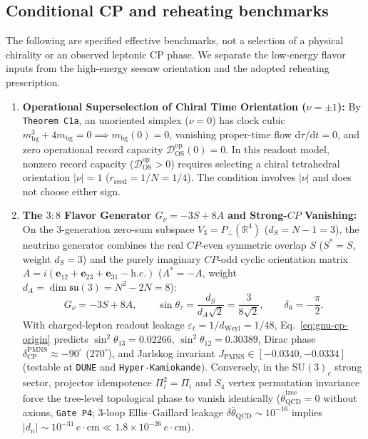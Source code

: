 \documentclass[11pt,a4paper]{article}
\begin{document}
\subsection{Conditional CP and reheating benchmarks}
\label{sec:cp-violation-and-f54-f55}

The following are specified effective benchmarks, not a selection of a physical chirality or an observed leptonic CP phase. We separate the low-energy flavor inputs from the high-energy seesaw orientation and the adopted reheating prescription.
\begin{enumerate}[label=(\arabic*),leftmargin=1.8em,itemsep=2pt]
\item \textbf{Operational Superselection of Chiral Time Orientation ($\nu = \pm 1$):} By \texttt{Theorem~C1a}, an unoriented simplex ($\nu = 0$) has clock cubic $m_{\mathrm{bg}}^3 + 4m_{\mathrm{bg}} = 0 \implies m_{\mathrm{bg}}(0) = 0$, vanishing proper-time flow $\mathrm{d}\tau/\mathrm{d}t = 0$, and zero operational record capacity $\mathcal{D}_{\mathrm{OS}}^{\mathrm{op}}(0) = 0$. In this readout model, nonzero record capacity ($\mathcal{D}_{\mathrm{OS}}^{\mathrm{op}} > 0$) requires selecting a chiral tetrahedral orientation $|\nu| = 1$ ($r_{\mathrm{seed}} = 1/N = 1/4$). The condition involves $|\nu|$ and does not choose either sign.
\item \textbf{The $3:8$ Flavor Generator $G_\nu = -3S + 8A$ and Strong-$CP$ Vanishing:} On the 3-generation zero-sum subspace $V_3 = P_\perp(\mathbb{R}^4)$ ($d_S = N - 1 = 3$), the neutrino generator combines the real $CP$-even symmetric overlap $S$ ($S^* = S$, weight $d_S = 3$) and the purely imaginary $CP$-odd cyclic orientation matrix $A = i(\mathbf{e}_{12} + \mathbf{e}_{23} + \mathbf{e}_{31} - \mathrm{h.c.})$ ($A^* = -A$, weight $d_A = \dim\mathfrak{su}(3) = N^2 - 2N = 8$):
\begin{equation}
G_\nu = -3S + 8A, \qquad \sin\theta_\tau = \frac{d_S}{d_A\sqrt{2}} = \frac{3}{8\sqrt{2}}, \qquad \delta_0 = -\frac{\pi}{2}.
\label{eq:gnu-cp-origin}
\end{equation}
With charged-lepton readout leakage $\varepsilon_\ell = 1/d_{\mathrm{Weyl}} = 1/48$, Eq.~\eqref{eq:gnu-cp-origin} predicts $\sin^2\theta_{13} = 0.02266$, $\sin^2\theta_{12} = 0.30389$, Dirac phase $\delta_{\mathrm{CP}}^{\mathrm{PMNS}} \approx -90^\circ$ ($270^\circ$), and Jarlskog invariant $J_{\mathrm{PMNS}} \in [-0.0340, -0.0334]$ (testable at \texttt{DUNE} and \texttt{Hyper-Kamiokande}). Conversely, in the $\mathrm{SU}(3)_c$ strong sector, projector idempotence $\Pi_i^2 = \Pi_i$ and $S_4$ vertex permutation invariance force the tree-level topological phase to vanish identically ($\bar{\theta}_{\mathrm{QCD}}^{\mathrm{tree}} = 0$ without axions, \texttt{Gate~P4}; 3-loop Ellis--Gaillard leakage $\delta\bar{\theta}_{\mathrm{QCD}} \sim 10^{-16}$ implies $|d_n| \sim 10^{-31}\,e\cdot\mathrm{cm} \ll 1.8\times 10^{-26}\,e\cdot\mathrm{cm}$).

\end{enumerate}
\end{document}

